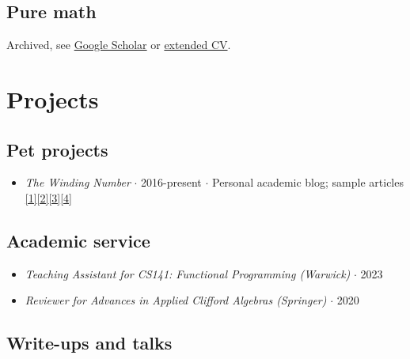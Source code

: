 \documentclass{article}
\begin{document}
\subsection*{Pure math}

Archived, see \href{https://scholar.google.co.in/citations?user=lb38BjYAAAAJ&hl=en}{Google Scholar} or \href{https://drive.google.com/file/d/1_VStBkw6DthYNyp4F3Xx2THInWLpNrHK/view?usp=drive_link}{extended CV}.

\section*{Projects}

\subsection*{Pet projects}

\begin{itemize}

    \item \emph{The Winding Number} $\cdot$ 2016-present $\cdot$ Personal academic blog; sample articles \href{https://thewindingnumber.blogspot.com/2019/10/sigma-fields-are-venn-diagrams.html}{[1]}\href{https://thewindingnumber.blogspot.com/2022/10/a-crash-course-on-mathematical-logic.html}{[2]}\href{https://thewindingnumber.blogspot.com/2020/08/hacking-evidential-decision-theory.html}{[3]}\href{https://thewindingnumber.blogspot.com/2019/05/whats-with-e-1x-on-smooth-non-analytic.html}{[4]}

\end{itemize}

\subsection*{Academic service}

\begin{itemize}

    \item \emph{Teaching Assistant for CS141: Functional Programming (Warwick)} $\cdot$ 2023
    
    \item \emph{Reviewer for Advances in Applied Clifford Algebras (Springer)} $\cdot$ 2020

\end{itemize}


\subsection*{Write-ups and talks}
\end{document}
